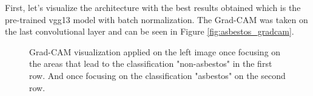 First, let's visualize the architecture with the best results obtained which is the pre-trained vgg13 model with batch normalization. The Grad-CAM was taken on the last convolutional layer and can be seen in Figure \ref{fig:asbestos_gradcam}. 

\begin{figure}[!h]
\centering
\caption{Grad-CAM visualization applied on the left image once focusing on the areas that lead to the classification "non-asbestos" in the first row. And once focusing on the classification "asbestos" on the second row.}


\end{figure}
